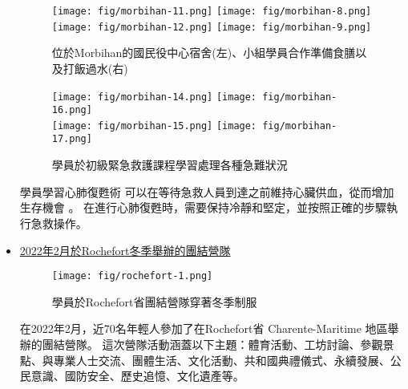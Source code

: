 \documentclass[a4paper,14pt]{extarticle}
\theoremstyle{plain}
\theoremstyle{remark}
\numberwithin{equation}{section}
\begin{document}
\begin{itemize}
\begin{figure}[H]
  \begin{center}
    \texttt{[image: fig/morbihan-11.png]}
    \texttt{[image: fig/morbihan-8.png]}
    \\
    \vspace{0.1cm}
    \texttt{[image: fig/morbihan-12.png]}
    \texttt{[image: fig/morbihan-9.png]}
  \end{center}
  \caption{位於Morbihan的國民役中心宿舍(左)、小組學員合作準備食膳以及打飯過水(右)}
\end{figure}

\begin{figure}[H]
  \begin{center}
    \texttt{[image: fig/morbihan-14.png]}
    \texttt{[image: fig/morbihan-16.png]}
    \\    \vspace{0.1cm}
    \texttt{[image: fig/morbihan-15.png]}
    \texttt{[image: fig/morbihan-17.png]}
  \end{center}
  \caption{學員於初級緊急救護課程學習處理各種急難狀況}
\end{figure}


    學員學習心肺復甦術
    可以在等待急救人員到達之前維持心臟供血，從而增加生存機會 。
    在進行心肺復甦時，需要保持冷靜和堅定，並按照正確的步驟執行急救操作。


  \item \href{https://www.youtube.com/watch?v=0cG4PWgDZ5Q}{2022年2月於Rochefort冬季舉辦的團結營隊}

    \begin{figure}[H]
      \begin{center}
        \texttt{[image: fig/rochefort-1.png]}
      \end{center}
      \caption{學員於Rochefort省團結營隊穿著冬季制服}
    \end{figure}

在2022年2月，近70名年輕人參加了在Rochefort省 Charente-Maritime 地區舉辦的團結營隊。
這次營隊活動涵蓋以下主題：體育活動、工坊討論、參觀景點、與專業人士交流、團體生活、文化活動、共和國典禮儀式、永續發展、公民意識、國防安全、歷史追憶、文化遺產等。
    

\end{itemize}
\end{document}
